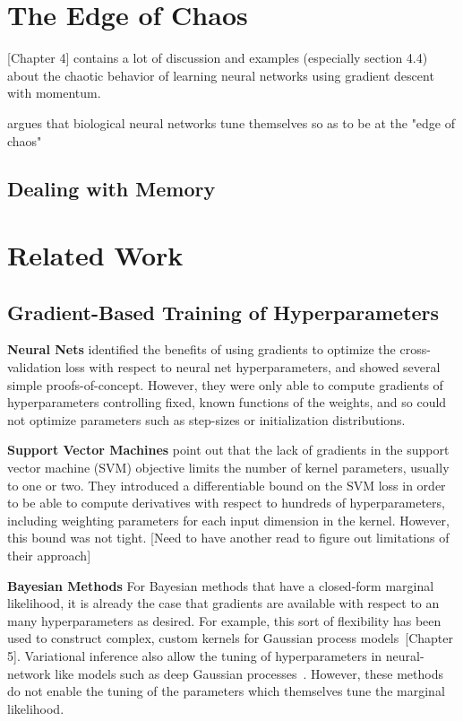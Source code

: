 \documentclass{article}
\begin{document}
\section{The Edge of Chaos}

\cite{pearlmutter1996investigation}[Chapter 4] contains a lot of discussion and examples (especially section 4.4) about the chaotic behavior of learning neural networks using gradient descent with momentum.

\cite{pearlmutter2009sleep} argues that biological neural networks tune themselves so as to be at the "edge of chaos"

\subsection{Dealing with Memory}


\section{Related Work}

\subsection{Gradient-Based Training of Hyperparameters}
\textbf{Neural Nets}
\citet{bengio2000gradient, larsen1998adaptive} identified the benefits of using gradients to optimize the cross-validation loss with respect to neural net hyperparameters, and showed several simple proofs-of-concept.
However, they were only able to compute gradients of hyperparameters controlling fixed, known functions of the weights, and so could not optimize parameters such as step-sizes or initialization distributions.

\textbf{Support Vector Machines}
\citet{chapelle2002choosing} point out that the lack of gradients in the support vector machine (SVM) objective limits the number of kernel parameters, usually to one or two.
They introduced a differentiable bound on the SVM loss in order to be able to compute derivatives with respect to hundreds of hyperparameters, including weighting parameters for each input dimension in the kernel.
However, this bound was not tight. [Need to have another read to figure out limitations of their approach]

\textbf{Bayesian Methods}
For Bayesian methods that have a closed-form marginal likelihood, it is already the case that gradients are available with respect to an many hyperparameters as desired.
For example, this sort of flexibility has been used to construct complex, custom kernels for Gaussian process models~\cite{rasmussen38gaussian}[Chapter 5].
Variational inference also allow the tuning of hyperparameters in neural-network like models such as deep Gaussian processes~\citep{deepGPVar14}.
However, these methods do not enable the tuning of the parameters which themselves tune the marginal likelihood.
\end{document}
